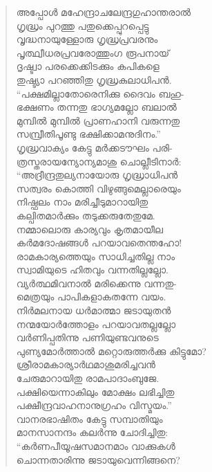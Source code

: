 \begin{verse}
അപ്പോള്‍ മഹേന്ദ്രാചലേന്ദ്രഗുഹാന്തരാല്‍\\
ഗൃദ്ധ്രം പുറത്തു പതുക്കെപ്പുറപ്പെട്ടു\\
വൃദ്ധനായുള്ളോരു ഗൃദ്ധ്രപ്രവരനും\\
പൃത്ഥ്വീധരപ്രവരോത്തുംഗ രൂപനായ്\\
ദൃഷ്ട്വാ പരക്കെക്കിടക്കും കപികളെ\\
തുഷ്ട്യാ പറഞ്ഞിതു ഗൃദ്ധ്രകുലാധിപന്‍.\\
“പക്ഷമില്ലാതോരെനിക്കു ദൈവം ബഹു-\\
ഭക്ഷണം തന്നതു ഭാഗ്യമല്ലോ ബലാല്‍\\
മുമ്പില്‍ മുമ്പില്‍ പ്രാണഹാനി വരുന്നതു\\
സമ്പ്രീതിപൂണ്ടു ഭക്ഷിക്കാമനുദിനം.”\\
ഗൃദ്ധ്രവാക്യം കേട്ടു മര്‍ക്കടൗഘം പരി-\\
ത്രസ്തരായന്യോന്യമാശു ചൊല്ലീടിനാര്‍:\\
“അദ്രീന്ദ്രതുല്യനായോരു ഗൃദ്ധ്രാധിപന്‍\\
സത്വരം കൊത്തി വിഴുങ്ങുമെല്ലാരെയും\\
നിഷ്ഫലം നാം മരിച്ചീടുമാറായിതു\\
കല്പിതമാര്‍ക്കും തടുക്കരുതേതുമേ.\\
നമ്മാലൊരു കാര്യവും കൃതമായീല\\
കര്‍മദോഷങ്ങള്‍ പറയാവതെന്തഹോ!\\
രാമകാര്യത്തെയും സാധിച്ചതില്ല നാം\\
സ്വാമിയുടെ ഹിതവും വന്നതില്ലല്ലോ.\\
വ്യര്‍ത്ഥമിവനാല്‍ മരിക്കെന്നു വന്നതു-\\
മെത്രയും പാപികളാകതന്നേ വയം.\\
നിര്‍മലനായ ധര്‍മാത്മാ ജടായുതന്‍\\
നന്മയോര്‍ത്തോളം പറയാവതല്ലല്ലോ\\
വര്‍ണിപ്പതിന്നു പണിയുണ്ടവനുടെ\\
പുണ്യമോര്‍ത്താല്‍ മറ്റൊരുത്തര്‍ക്കു കിട്ടുമോ?\\
ശ്രീരാമകാര്യാര്‍ഥമാശുമരിച്ചവന്‍\\
ചേരുമാറായിതു രാമപാദാംബുജേ.\\
പക്ഷിയെന്നാകിലും മോക്ഷം ലഭിച്ചിതു\\
പക്ഷീന്ദ്രവാഹനാനുഗ്രഹം വിസ്മയം.”\\
വാനരഭാഷിതം കേട്ടു സമ്പാതിയും\\
മാനസാനന്ദം കലര്‍ന്നു ചോദിച്ചിതു:\\
“കര്‍ണപീയൂഷസമാനമാം വാക്കുകള്‍\\
ചൊന്നതാരിന്നു ജടായുവെന്നിങ്ങനെ?\\

\end{verse}
